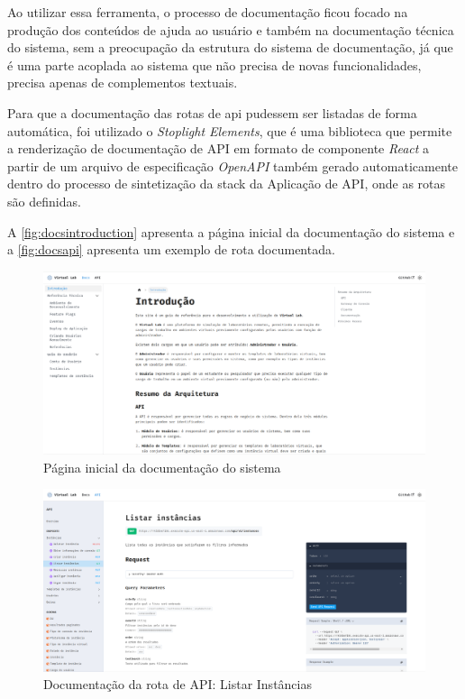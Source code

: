 Ao utilizar essa ferramenta, o processo de documentação ficou focado na produção dos conteúdos de ajuda ao usuário e também na documentação técnica do sistema, sem a preocupação da estrutura do sistema de documentação, já que é uma parte acoplada ao sistema que não precisa de novas funcionalidades, precisa apenas de complementos textuais.

Para que a documentação das rotas de api pudessem ser listadas de forma automática, foi utilizado o \textit{Stoplight Elements}, que é uma biblioteca que permite a renderização de documentação de API em formato de componente \textit{React} a partir de um arquivo de especificação \textit{OpenAPI} também gerado automaticamente dentro do processo de sintetização da stack da Aplicação de API, onde as rotas são definidas.

A \autoref{fig:docsintroduction} apresenta a página inicial da documentação do sistema e a \autoref{fig:docsapi} apresenta um exemplo de rota documentada.

\begin{figure}[H]
\caption{Página inicial da documentação do sistema}
\label{fig:docsintroduction}
\includegraphics[width=\textwidth]{capitulos/2-metodologia/files/docs-introduction.png}
\end{figure}

\begin{figure}[H]
\caption{Documentação da rota de API: Listar Instâncias}
\label{fig:docsapi}
\includegraphics[width=\textwidth]{capitulos/2-metodologia/files/docs-api.png}
\end{figure}

